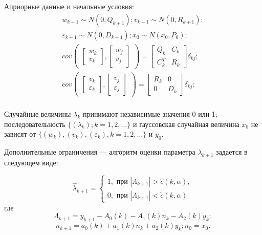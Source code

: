 \documentclass[a4paper,12pt]{article}
\begin{document}
Априорные данные и начальные условия:
\[
	\begin{array}{l}
		w_{k+1} \sim N(0, Q_{k+1}); v_{k+1} \sim N(0, R_{k+1}); \\
		\varepsilon_{k+1} \sim N(0, D_{k+1}); x_0 \sim N(\bar{x_0}, P_0); \\

		cov\left( 
		\begin{array}{cc} 
			\left[ \begin{array}{cc} w_k \\ v_k \end{array} \right]  
			,\left[ \begin{array}{cc} w_j \\ v_j \end{array} \right]
		\end{array}
		\right) 
		= 
		\left[ \begin{array}{cc} Q_k & C_k \\ C^T_k & R_k \end{array} \right]
			\delta_{kj}; \\

		cov\left( 
		\begin{array}{cc} 
			\left[ \begin{array}{cc} v_k \\ \varepsilon_k \end{array} \right]  
			,\left[ \begin{array}{cc} v_j \\ \varepsilon_j \end{array} \right]
		\end{array}
		\right) 
		= 
		\left[ \begin{array}{cc} R_k & 0 \\ 0 & D_k \end{array} \right]
			\delta_{kj}; \\

	\end{array}
\]

Случайные величины $\lambda_k$ принимают независимые значения 0 или 1;
последовательность ${\{(\lambda_k); k=1,2,\ldots\}}$ и гауссовская случайная
величина $x_0$ не зависят от ${\{(w_k), (v_k), (\varepsilon_k), k=1,2,\ldots\}}$ 
и $y_0$.

Дополнительные ограничения --- алгоритм оценки параметра $\lambda_{k+1}$
задается в следующем виде:

\[ 
	\hat{\lambda}_{k+1} = \left\{ 
	\begin{array}{cc} 
		1, \mbox{ при } |\Lambda_{k+1}| > \hat{c}(k, \alpha), \\
		0, \mbox{ при } |\Lambda_{k+1}| < \tilde{c}(k, \alpha)
	\end{array} \right.
\]
\indent где 
\[ \Lambda_{k+1} = y_{k+1} - A_0(k) - A_1(k) n_k - A_2(k) y_k ; \]
\[ n_{k+1} = a_0(k) + a_1(k) n_k + a_2(k) y_k; n_0 = \bar{x}_0. \]
\end{document}
